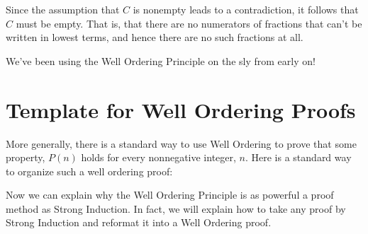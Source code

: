 Since the assumption that $C$ is nonempty leads to a contradiction, it
follows that $C$ must be empty.  That is, that there are no numerators of
fractions that can't be written in lowest terms, and hence there are no
such fractions at all.

We've been using the Well Ordering Principle on the sly from early on!


\section{Template for Well Ordering Proofs}

More generally, there is a standard way to use Well Ordering to prove that
some property, $P(n)$ holds for every nonnegative integer, $n$.  Here is a
standard way to organize such a well ordering proof:


\iffalse
Now we can explain why the Well Ordering Principle is as powerful a proof
method as Strong Induction.  In fact, we will explain how to take any
proof by Strong Induction and reformat it into a Well Ordering proof.

